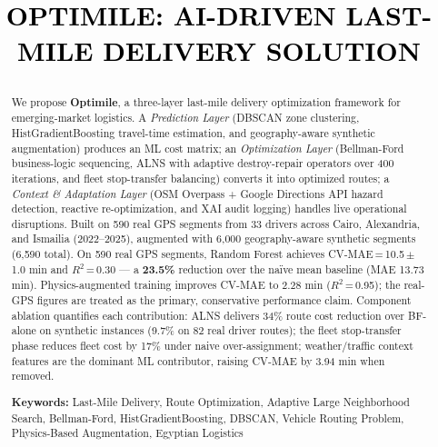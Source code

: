 \documentclass[conference]{IEEEtran}
\begin{document}
\title{
\begin{minipage}{\textwidth}
    \centering
    {\LARGE\textbf{\textcolor{black}{\uppercase{Optimile: AI-Driven Last-Mile Delivery Solution}}}}
\end{minipage}
}

\author{
}

\maketitle

\begin{abstract}
We propose \textbf{Optimile}, a three-layer last-mile delivery optimization
framework for emerging-market logistics. A \textit{Prediction Layer} (DBSCAN zone
clustering, HistGradientBoosting travel-time estimation, and geography-aware
synthetic augmentation) produces an ML cost matrix; an \textit{Optimization Layer}
(Bellman-Ford business-logic sequencing, ALNS with adaptive destroy-repair
operators over 400 iterations, and fleet stop-transfer balancing) converts it into
optimized routes; a \textit{Context \& Adaptation Layer} (OSM Overpass + Google
Directions API hazard detection, reactive re-optimization, and XAI audit logging)
handles live operational disruptions. Built on 590 real GPS segments from 33
drivers across Cairo, Alexandria, and Ismailia (2022--2025), augmented with 6,000
geography-aware synthetic segments (6,590 total).
On 590 real GPS segments, Random Forest achieves CV-MAE\,=\,10.5\,$\pm$\,1.0
min and $R^2$\,=\,0.30 — a \textbf{23.5\%} reduction over the na\"{i}ve mean baseline
(MAE 13.73 min). Physics-augmented training improves CV-MAE to 2.28 min
($R^2$\,=\,0.95); the real-GPS figures are treated as the primary, conservative
performance claim. Component ablation quantifies each contribution: ALNS
delivers 34\% route cost reduction over BF-alone on synthetic instances (9.7\%
on 82 real driver routes); the fleet stop-transfer phase reduces fleet cost by
17\% under naive over-assignment; weather/traffic context features are the
dominant ML contributor, raising CV-MAE by 3.94 min when removed.

\textbf{Keywords:} Last-Mile Delivery, Route Optimization, Adaptive Large
Neighborhood Search, Bellman-Ford, HistGradientBoosting, DBSCAN, Vehicle
Routing Problem, Physics-Based Augmentation, Egyptian Logistics
\end{abstract}
\end{document}
